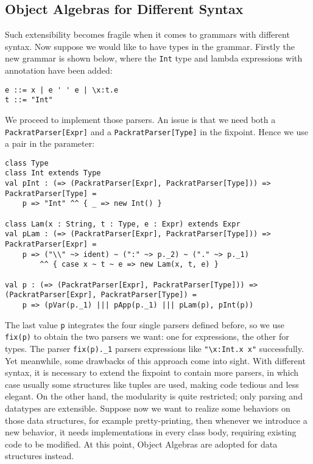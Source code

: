 \subsection{Object Algebras for Different Syntax}\label{subsec:differentsyntax}

Such extensibility becomes fragile when it comes to grammars with different syntax. Now suppose we would like to have types in the grammar. Firstly the new grammar is shown below, where the \lstinline{Int} type and lambda expressions with annotation have been added:
\begin{lstlisting}
e ::= x | e ' ' e | \x:t.e
t ::= "Int"
\end{lstlisting}

We proceed to implement those parsers. An issue is that we need both a \lstinline{PackratParser[Expr]} and a \lstinline{PackratParser[Type]} in the fixpoint.
Hence we use a pair in the parameter:
\begin{lstlisting}
class Type
class Int extends Type
val pInt : (=> (PackratParser[Expr], PackratParser[Type])) => PackratParser[Type] =
    p => "Int" ^^ { _ => new Int() }

class Lam(x : String, t : Type, e : Expr) extends Expr
val pLam : (=> (PackratParser[Expr], PackratParser[Type])) => PackratParser[Expr] =
    p => ("\\" ~> ident) ~ (":" ~> p._2) ~ ("." ~> p._1)
        ^^ { case x ~ t ~ e => new Lam(x, t, e) }

val p : (=> (PackratParser[Expr], PackratParser[Type])) => (PackratParser[Expr], PackratParser[Type]) =
    p => (pVar(p._1) ||| pApp(p._1) ||| pLam(p), pInt(p))
\end{lstlisting}
The last value \lstinline{p} integrates the four single parsers defined before, so we use \lstinline{fix(p)} to
obtain the two parsers we want: one for expressions, the other for types. The parser \lstinline{fix(p)._1} parsers expressions
like \lstinline{"\x:Int.x x"} successfully. Yet meanwhile, some drawbacks of this approach come into sight. With different syntax, it
is necessary to extend the fixpoint to contain more parsers, in which case usually some structures like tuples are used,
making code tedious and less elegant. On the other hand, the modularity is quite restricted; only parsing and datatypes are extensible.
Suppose now we want to realize some behaviors on those data structures, for example pretty-printing, then whenever we introduce a new behavior,
it needs implementations in every class body, requiring existing code to be modified. At this point, Object Algebras are adopted for data structures
instead.

